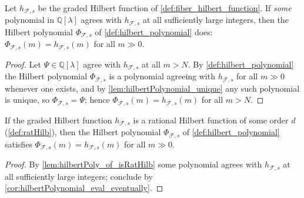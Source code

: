 \begin{corollary}\leanok
  \label{cor:hilbertPolynomial_eval_eventually}
  Let \(h_{\mathcal{F},s}\) be the graded Hilbert function of
  \cref{def:fiber_hilbert_function}. If \emph{some} polynomial in
  \(\mathbb{Q}[\lambda]\) agrees with \(h_{\mathcal{F},s}\) at all
  sufficiently large integers, then the Hilbert polynomial
  \(\Phi_{\mathcal{F},s}\) of \cref{def:hilbert_polynomial} does:
  \(\Phi_{\mathcal{F},s}(m) = h_{\mathcal{F},s}(m)\) for all \(m \gg 0\).
\end{corollary}

\begin{proof}
  \leanok
  Let \(\Psi \in \mathbb{Q}[\lambda]\) agree with \(h_{\mathcal{F},s}\) at all
  \(m > N\). By \cref{def:hilbert_polynomial} the Hilbert polynomial
  \(\Phi_{\mathcal{F},s}\) is a polynomial agreeing with
  \(h_{\mathcal{F},s}\) for all \(m \gg 0\) whenever one exists, and by
  \cref{lem:hilbertPolynomial_unique} any such polynomial is unique, so
  \(\Phi_{\mathcal{F},s} = \Psi\); hence
  \(\Phi_{\mathcal{F},s}(m) = h_{\mathcal{F},s}(m)\) for all \(m > N\).
\end{proof}

\begin{corollary}\leanok
  \label{cor:hilbertPolynomial_eval_of_isRatHilb}
  If the graded Hilbert function \(h_{\mathcal{F},s}\) is a rational Hilbert
  function of some order \(d\) (\cref{def:ratHilb}), then the Hilbert
  polynomial \(\Phi_{\mathcal{F},s}\) of \cref{def:hilbert_polynomial}
  satisfies \(\Phi_{\mathcal{F},s}(m) = h_{\mathcal{F},s}(m)\) for all
  \(m \gg 0\).
\end{corollary}

\begin{proof}
  \leanok
  By \cref{lem:hilbertPoly_of_isRatHilb} some polynomial agrees with
  \(h_{\mathcal{F},s}\) at all sufficiently large integers; conclude by
  \cref{cor:hilbertPolynomial_eval_eventually}.
\end{proof}

